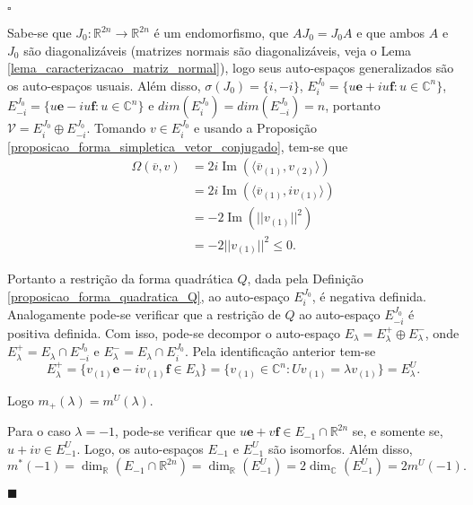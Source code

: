 \documentclass[12pt]{book}
\newenvironment{prova}[1]{$\square$ #1}{\hfill$\blacksquare$}
\DeclareMathOperator{\Ima}{Im}
\newcommand{\autoespaco}[1]{E_{#1}}
\newcommand{\complexificado}[1]{\mathcal{#1}}
\newcommand{\complexo}[1]{\mathbb{C}^{#1}}
\newcommand{\espectrooperador}[1]{\sigma(#1)}
\newcommand{\estruturacomplexa}{J_{0}}
\newcommand{\formaSimpleticaExtendida}[2]{\Omega(#1, #2)}
\newcommand{\norma}[1]{||#1||}
\newcommand{\parteImaginaria}[1]{\Ima{(#1)}}
\newcommand{\produtointerno}[2]{\langle #1, #2 \rangle}
\newcommand{\real}[1]{\mathbb{R}^{#1}}
\newcommand{\reta}{\real{}}
\begin{document}
\begin{prova}
\begin{enumerate}
			Sabe-se que $\estruturacomplexa: \real{2n} \to \real{2n}$ é um endomorfismo, que $A\estruturacomplexa = \estruturacomplexa A$ e que ambos $A$ e $\estruturacomplexa$ são diagonalizáveis (matrizes normais são diagonalizáveis, veja o Lema \ref{lema_caracterizacao_matriz_normal}), logo seus auto-espaços generalizados são os auto-espaços usuais. Além disso, $\espectrooperador{\estruturacomplexa} = \{i,-i\}$, $\autoespaco{i}^{\estruturacomplexa} = \{u\textbf{e} +iu\textbf{f}: u \in \complexo{n}\}$, $\autoespaco{ -i}^{\estruturacomplexa} = \{u\textbf{e} -iu\textbf{f}: u \in \complexo{n}\}$ e $dim(\autoespaco{i}^{\estruturacomplexa} )=dim(\autoespaco{-i}^{\estruturacomplexa} )=n$, portanto $\complexificado{V} = \autoespaco{i}^{\estruturacomplexa}\oplus \autoespaco{-i}^{\estruturacomplexa}$. 
			Tomando $v \in \autoespaco{i}^{\estruturacomplexa}$ e usando a Proposição \ref{proposicao_forma_simpletica_vetor_conjugado}, tem-se que 
			$$
			\begin{aligned}
			\formaSimpleticaExtendida{\overline{v}}{v} 
			&= 2i\parteImaginaria{\produtointerno{\overline{v}_{(1)}}{v_{(2)}}}
			\\
			&= 2i\parteImaginaria{\produtointerno{\overline{v}_{(1)}}{iv_{(1)}}}
			\\
			&=-2\parteImaginaria{\norma{v_{(1)}}^{2}}
			\\
			&=-2\norma{v_{(1)}}^{2} \leq 0.
			\end{aligned}
			$$
			
			Portanto a restrição da forma quadrática $Q$, dada pela Definição \ref{proposicao_forma_quadratica_Q}, ao auto-espaço $\autoespaco{ i}^{\estruturacomplexa}$, é negativa definida. Analogamente pode-se verificar que a restrição de $Q$ ao auto-espaço $\autoespaco{ -i}^{\estruturacomplexa}$ é positiva definida. Com isso, pode-se decompor o auto-espaço $\autoespaco{\lambda} = \autoespaco{\lambda}^{+} \oplus \autoespaco{\lambda}^{-}$, onde $\autoespaco{\lambda}^{+} = \autoespaco{\lambda}\cap \autoespaco{- i}^{\estruturacomplexa} $ e $\autoespaco{\lambda}^{-} = \autoespaco{\lambda}\cap \autoespaco{ i}^{\estruturacomplexa} $. Pela identificação anterior tem-se
			$$
			\autoespaco{\lambda}^{+}=\{v_{(1)}\textbf{e}-iv_{(1)}\textbf{f}\in \autoespaco{\lambda}\} = \{v_{(1)} \in \complexo{n} : Uv_{(1)}=\lambda v_{(1)} \} = \autoespaco{\lambda}^{U}.
			$$
			
			Logo $m_{+}(\lambda) = m^{U}(\lambda)$.
			
			Para o caso $\lambda=-1$, pode-se verificar que $u\textbf{e}+v\textbf{f} \in \autoespaco{-1}\cap \real{2n}$ se, e somente se, $u+iv \in \autoespaco{-1}^{U}$. Logo, os auto-espaços $\autoespaco{-1}$ e $\autoespaco{-1}^{U}$ são isomorfos. Além disso, 
			$$
			m^{*}(-1) = \dim_{\reta}(\autoespaco{-1}\cap \real{2n}) = \dim_{\reta}(\autoespaco{-1}^{U}) = 2\dim_{\complexo{}}(\autoespaco{-1}^{U}) =2m^{U}(-1).
			$$
			

\end{enumerate}
\end{prova}
\end{document}
